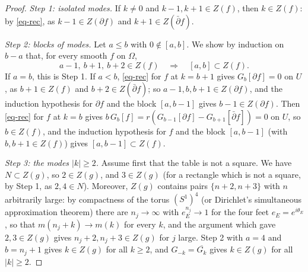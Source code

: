 \documentclass[a4paper,11pt,twoside,leqno]{article}
\numberwithin{equation}{section}
\begin{document}
\begin{proof}
\emph{Step 1: isolated modes.} If $k \neq 0$ and $k-1, k+1 \in Z(f)$, then $k \in Z(f)$: by \eqref{eq-rec}, as $k - 1 \in Z(\partial f)$ and $k+1 \in Z(\bar\partial f)$.

\emph{Step 2: blocks of modes.} Let $a \leq b$ with $0 \notin [a, b]$. We show by induction on $b - a$ that, for every smooth $f$ on $\Omega$,
\[
a-1,\ b+1,\ b+2 \in Z(f) \quad \Longrightarrow \quad [a, b] \subset Z(f).
\]
If $a = b$, this is Step 1. If $a < b$, \eqref{eq-rec} for $f$ at $k = b+1$ gives $G_b[\partial f] = 0$ on $U$, as $b+1 \in Z(f)$ and $b+2 \in Z(\bar\partial f)$; so $a - 1, b, b+1 \in Z(\partial f)$, and the induction hypothesis for $\partial f$ and the block $[a, b-1]$ gives $b - 1 \in Z(\partial f)$. Then \eqref{eq-rec} for $f$ at $k = b$ gives $b\, G_b[f] = r(G_{b-1}[\partial f] - G_{b+1}[\bar\partial f]) = 0$ on $U$, so $b \in Z(f)$, and the induction hypothesis for $f$ and the block $[a, b-1]$ (with $b, b+1 \in Z(f)$) gives $[a, b-1] \subset Z(f)$.

\emph{Step 3: the modes $|k| \geq 2$.} Assume first that the table is not a square. We have $N \subset Z(g)$, so $2 \in Z(g)$, and $3 \in Z(g)$ (for a rectangle which is not a square, by Step 1, as $2, 4 \in N$). Moreover, $Z(g)$ contains pairs $\{n+2, n+3\}$ with $n$ arbitrarily large: by compactness of the torus $(S^1)^4$ (or Dirichlet's simultaneous approximation theorem) there are $n_j \to \infty$ with $e_E^{n_j} \to 1$ for the four feet $e_E = e^{i\theta_E}$, so that $m(n_j + k) \to m(k)$ for every $k$, and the argument which gave $2, 3 \in Z(g)$ gives $n_j + 2, n_j + 3 \in Z(g)$ for $j$ large. Step 2 with $a = 4$ and $b = n_j + 1$ gives $k \in Z(g)$ for all $k \geq 2$, and $G_{-k} = \overline{G_k}$ gives $k \in Z(g)$ for all $|k| \geq 2$.


\end{proof}
\end{document}
